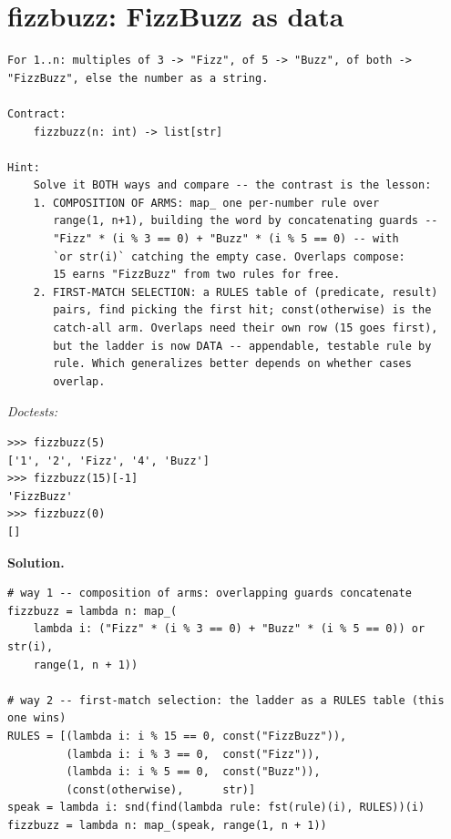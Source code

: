 \documentclass[11pt,letterpaper]{book}
\begin{document}
\section{fizzbuzz: FizzBuzz as data}
\begin{lstlisting}[style=spec]
For 1..n: multiples of 3 -> "Fizz", of 5 -> "Buzz", of both ->
"FizzBuzz", else the number as a string.

Contract:
    fizzbuzz(n: int) -> list[str]

Hint:
    Solve it BOTH ways and compare -- the contrast is the lesson:
    1. COMPOSITION OF ARMS: map_ one per-number rule over
       range(1, n+1), building the word by concatenating guards --
       "Fizz" * (i % 3 == 0) + "Buzz" * (i % 5 == 0) -- with
       `or str(i)` catching the empty case. Overlaps compose:
       15 earns "FizzBuzz" from two rules for free.
    2. FIRST-MATCH SELECTION: a RULES table of (predicate, result)
       pairs, find picking the first hit; const(otherwise) is the
       catch-all arm. Overlaps need their own row (15 goes first),
       but the ladder is now DATA -- appendable, testable rule by
       rule. Which generalizes better depends on whether cases
       overlap.
\end{lstlisting}
\noindent\textit{Doctests:}
\begin{lstlisting}[style=spec]
>>> fizzbuzz(5)
['1', '2', 'Fizz', '4', 'Buzz']
>>> fizzbuzz(15)[-1]
'FizzBuzz'
>>> fizzbuzz(0)
[]
\end{lstlisting}
\noindent\textbf{Solution.}
\begin{lstlisting}[style=code]
# way 1 -- composition of arms: overlapping guards concatenate
fizzbuzz = lambda n: map_(
    lambda i: ("Fizz" * (i % 3 == 0) + "Buzz" * (i % 5 == 0)) or str(i),
    range(1, n + 1))

# way 2 -- first-match selection: the ladder as a RULES table (this one wins)
RULES = [(lambda i: i % 15 == 0, const("FizzBuzz")),
         (lambda i: i % 3 == 0,  const("Fizz")),
         (lambda i: i % 5 == 0,  const("Buzz")),
         (const(otherwise),      str)]
speak = lambda i: snd(find(lambda rule: fst(rule)(i), RULES))(i)
fizzbuzz = lambda n: map_(speak, range(1, n + 1))
\end{lstlisting}
\end{document}
